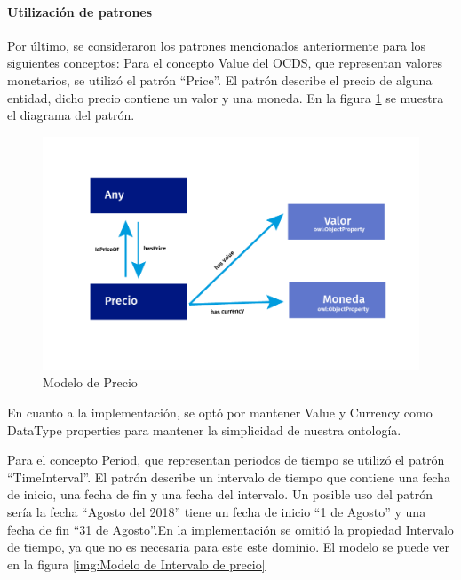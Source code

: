 \paragraph{Utilización de patrones}
Por último, se consideraron los patrones mencionados anteriormente para los siguientes conceptos:
Para el concepto Value del OCDS, que representan valores monetarios, se utilizó el patrón “Price”. El patrón describe el precio de alguna entidad, dicho precio contiene un valor y una moneda. En la figura \ref{img:Modelo de Precio} se muestra el diagrama del patrón.

\begin{figure}[h!]
    \centering
    \includegraphics[width=150mm]{figuras/Diagramas_Precio.png}
    \caption{Modelo de Precio}
    \label{img:Modelo de Precio}
    
\end{figure}

En cuanto a la implementación, se optó por mantener Value y Currency como DataType properties para mantener la simplicidad de nuestra ontología.

Para el concepto Period, que representan periodos de tiempo se utilizó el patrón “TimeInterval”. El patrón describe un intervalo de tiempo que contiene una fecha de inicio, una fecha de fin y una fecha del intervalo. Un posible uso del patrón sería la fecha “Agosto del 2018” tiene un fecha de inicio “1 de Agosto” y una fecha de fin “31 de Agosto”.En la implementación se omitió la propiedad Intervalo de tiempo, ya que no es necesaria para este este dominio. El modelo se puede ver en la figura \ref{img:Modelo de Intervalo de precio}

